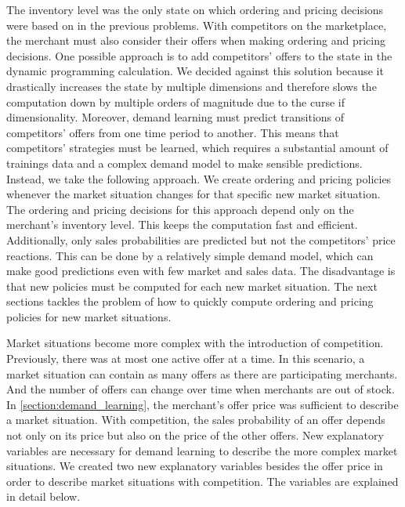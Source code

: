 

The inventory level was the only state on which ordering and pricing decisions were based on in the previous problems.
With competitors on the marketplace, the merchant must also consider their offers when making ordering and pricing decisions.
One possible approach is to add competitors' offers to the state in the dynamic programming calculation.
We decided against this solution because it drastically increases the state by multiple dimensions and therefore slows the computation down by multiple orders of magnitude due to the curse if dimensionality.
Moreover, demand learning must predict transitions of competitors' offers from one time period to another.
This means that competitors' strategies must be learned, which requires a substantial amount of trainings data and a complex demand model to make sensible predictions.
Instead, we take the following approach.
We create ordering and pricing policies whenever the market situation changes for that specific new market situation.
The ordering and pricing decisions for this approach depend only on the merchant's inventory level.
This keeps the computation fast and efficient.
Additionally, only sales probabilities are predicted but not the competitors' price reactions.
This can be done by a relatively simple demand model, which can make good predictions even with few market and sales data.
The disadvantage is that new policies must be computed for each new market situation.
The next sections tackles the problem of how to quickly compute ordering and pricing policies for new market situations.

Market situations become more complex with the introduction of competition.
Previously, there was at most one active offer at a time.
In this scenario, a market situation can contain as many offers as there are participating merchants.
And the number of offers can change over time when merchants are out of stock.
In \cref{section:demand_learning}, the merchant's offer price was sufficient to describe a market situation.
With competition, the sales probability of an offer depends not only on its price but also on the price of the other offers.
New explanatory variables are necessary for demand learning to describe the more complex market situations.
We created two new explanatory variables besides the offer price in order to describe market situations with competition.
The variables are explained in detail below.

